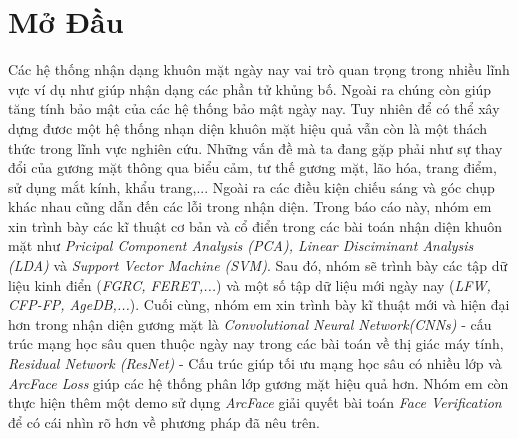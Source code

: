 \documentclass[a4paper, 12pt]{article}
\begin{document}
\section{Mở Đầu}
Các hệ thống nhận dạng khuôn mặt ngày nay vai trò quan trọng trong nhiều lĩnh vực ví dụ như giúp nhận dạng các phần tử khủng bố. Ngoài ra chúng còn giúp tăng tính bảo mật của các hệ thống bảo mật ngày nay. Tuy nhiên để có thể xây dựng đươc một hệ thống nhạn diện khuôn mặt hiệu quả vẫn còn là một thách thức trong lĩnh vực nghiên cứu. Những vấn đề mà ta đang gặp phải như sự thay đổi của gương mặt thông qua biểu cảm, tư thế gương mặt, lão hóa, trang điểm, sử dụng mắt kính, khẩu trang,... Ngoài ra các điều kiện chiếu sáng và góc chụp khác nhau cũng dẫn đến các lỗi trong nhận diện. Trong  báo cáo này, nhóm em xin trình bày các kĩ thuật cơ bản và cổ điển trong các bài toán nhận diện khuôn mặt như \textit{Pricipal Component Analysis (PCA), Linear Disciminant Analysis (LDA)} và \textit{Support Vector Machine (SVM)}. Sau đó, nhóm sẽ trình bày các tập dữ liệu kinh điển (\textit{FGRC, FERET,...}) và một số tập dữ liệu mới ngày nay (\textit{LFW, CFP-FP, AgeDB,...}). Cuối cùng, nhóm em xin trình bày kĩ thuật mới và hiện đại hơn trong nhận diện gương mặt là \textit{Convolutional Neural Network(CNNs)} - cấu trúc mạng học sâu quen thuộc ngày nay trong các bài toán về thị giác máy tính, \textit{Residual Network (ResNet)} - Cấu trúc giúp tối ưu mạng học sâu có nhiều lớp và \textit{ArcFace Loss} giúp các hệ thống phân lớp gương mặt hiệu quả hơn. Nhóm em còn thực hiện thêm một demo sử dụng \textit{ArcFace} giải quyết bài toán \textit{Face Verification} để có cái nhìn rõ hơn về phương pháp đã nêu trên.
\end{document}
